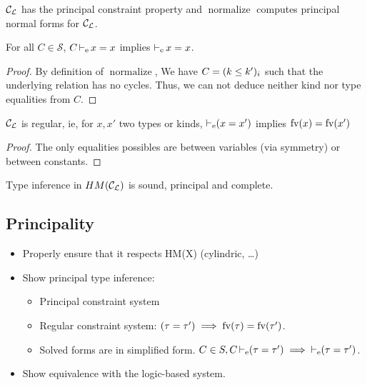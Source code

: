 \begin{theorem}
  ${\mathcal C_{\mathcal L}}$ has the principal constraint property and
  $\operatorname{normalize}$ computes principal normal forms for ${\mathcal C_{\mathcal L}}$.
\end{theorem}

\begin{lemma}
  For all $C\in\mathcal S$, $C \operatorname{\vdash_e} x = x$ implies
  $\operatorname{\vdash_e} x = x$.
\end{lemma}
\begin{proof}
  By definition of $\operatorname{normalize}$, We have $C = (k \leq k')_i$
  such that the underlying relation has no cycles.
  Thus, we can not deduce neither kind nor type equalities from $C$.
\end{proof}

\begin{lemma}
  ${\mathcal C_{\mathcal L}}$ is regular, ie, for $x, x'$ two types or kinds,
  $\operatorname{\vdash_e} (x = x')$ implies
  $\operatorname{fv}(x) = \operatorname{fv}(x')$
\end{lemma}
\begin{proof}
  The only equalities possibles are between variables (via symmetry) or
  between constants.
\end{proof}

\begin{theorem}
  Type inference in $HM({\mathcal C_{\mathcal L}})$ is sound, principal and complete.
\end{theorem}


\subsection{Principality}

\TODO{}

\begin{itemize}
\item Properly ensure that it respects HM(X) (cylindric, \dots)
\item Show principal type inference:
  \begin{itemize}
  \item Principal constraint system
  \item Regular constraint system: $(\tau = \tau') \implies \operatorname{fv}(\tau) = \operatorname{fv}(\tau')$.
  \item Solved forms are in simplified form.
    $C\in S, C \operatorname{\vdash_e} (\tau = \tau') \implies \operatorname{\vdash_e} (\tau = \tau')$.
  \end{itemize}
\item Show equivalence with the logic-based system.

\end{itemize}


